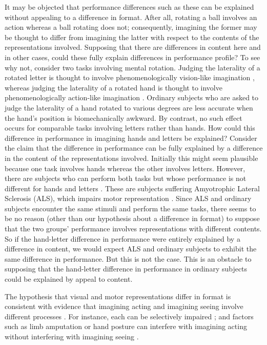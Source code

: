 \documentclass[12pt,\papersize]{extarticle}
\begin{document}
It may be objected that performance differences such as these can be explained without appealing to a difference in format.  After all, rotating a ball involves an action whereas a ball rotating does not; consequently, imagining the former may be thought to differ from imagining the latter with respect to the contents of the representations involved. Supposing that there are differences in content here and in other cases, could these fully explain differences in performance profile?  To see why not, consider two tasks involving mental rotation. Judging the laterality of a rotated letter is thought to involve phenomenologically vision-like imagination \citep{jordan:2001_cortical}, whereas judging the laterality of a rotated hand is thought to involve phenomenologically action-like imagination \citep{parsons:1987_imagined, gentilucci:1998_right}. Ordinary subjects who are asked to judge the laterality of a hand rotated to various degrees are less accurate when the hand's position is biomechanically awkward. By contrast, no such effect occurs for comparable tasks involving letters rather than hands. How could this difference in performance in imagining hands and letters be explained? Consider the claim that the difference in performance can be fully explained by a difference in the content of the representations involved.  Initially this might seem plausible because one task involves hands whereas the other involves letters.  However, there are subjects who can perform both tasks but whose performance is not different for hands and letters \citep{Fiori:2012fk}. These are subjects suffering Amyotrophic Lateral Sclerosis (ALS), which impairs motor representation \citep{parsons:1998_cerebrally}. Since ALS and ordinary subjects encounter the same stimuli and perform the same tasks, there seems to be no reason (other than our hypothesis about a difference in format) to suppose that the two groups' performance involves representations with different contents.  So if the hand-letter difference in performance were entirely explained by a difference in content, we would expect ALS and ordinary subjects to exhibit the same difference in performance. But this is not the case. This is an obstacle to supposing that the hand-letter difference in performance in ordinary subjects could be explained by appeal to content.  

The hypothesis that visual and motor representations differ in format is consistent with evidence that imagining acting and imagining seeing involve different processes \citep{kosslyn:2001_imagining}. For instance, each can be selectively impaired \citep{sirigu:2011_motor}; and factors such as limb amputation or hand posture can interfere with imagining acting without interfering with  imagining seeing \citep{nico:2004_left, vargas:2004s_influence,  fourkas:2006_influence}.
\end{document}
